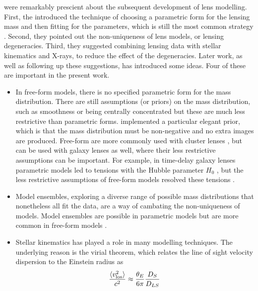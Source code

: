 \documentclass[galley,usenatbib]{mn2e}
\begin{document}
\cite{1981ApJ...244..736Y} were remarkably prescient about the
subsequent development of lens modelling.  First, the introduced the
technique of choosing a parametric form for the lensing mass and then
fitting for the parameters, which is still the most common strategy
\citep[see for example][]{2010GReGr..42.2151K,2011A&ARv..19...47K}.
Second, they pointed out the non-uniqueness of lens models, or lensing
degeneracies.  Third, they suggested combining lensing data with
stellar kinematics and X-rays, to reduce the effect of the
degeneracies.  Later work, as well as following up these suggestions,
has introduced some ideas.  Four of these are important in the present
work.
\begin{itemize}
\item In free-form models, there is no specified parametric form for
  the mass distribution.  There are still assumptions (or priors) on
  the mass distribution, such as smoothness or being centrally
  concentrated
  \citep{1997MNRAS.292..148S,2005MNRAS.360..477D,2010ApJ...723.1678C}
  but these are much less restrictive than parametric forms.
  \cite{2006MNRAS.367.1209L} implemented a particular elegant prior,
  which is that the mass distribution must be non-negative and no
  extra images are produced.  Free-form are more commonly used with
  cluster lenses \citep{2009ApJ...690..154S,2013arXiv1304.2393S}, but
  can be used with galaxy lenses as well, where their less restrictive
  assumptions can be important.  For example, in time-delay galaxy
  lenses parametric models led to tensions with the Hubble parameter
  $H_0$ \citep[e.g.][]{2002astro.ph..4043K,2002ApJ...578...25K}, but
  the less restrictive assumptions of free-form models resolved these
  tensions \citep{2007ApJ...667..645R}.
\item Model ensembles, exploring a diverse range of possible mass
  distributions that nonetheless all fit the data, are a way of
  cambating the non-uniqueness of models.  Model ensembles are
  possible in parametric models \citep{1999AJ....118...14B} but are
  more common in free-form models
  \citep{2000AJ....119..439W,2009ApJ...690..154S,2012MNRAS.425.3077L}.
\item Stellar kinematics has played a role in many modelling
  techniques.  The underlying reason is the virial theorem, which
  relates the line of sight velocity dispersion to the Einstein radius
  as
\begin{equation}
  \frac{\langle v^2_{\rm los}\rangle}{c^2} \approx
  \frac{\theta_E}{6\pi} \frac{D_S}{D_{LS}}
\end{equation}

\end{itemize}
\end{document}
